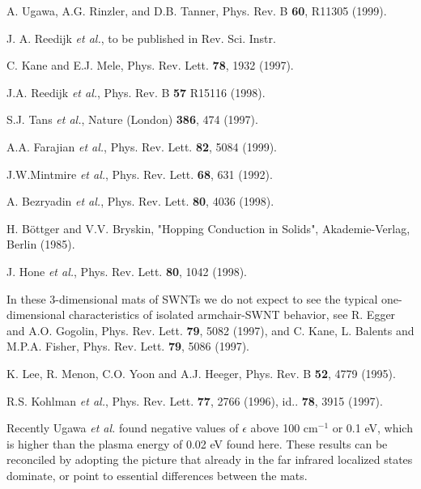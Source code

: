 \begin{multicols}{2}
\begin{thebibliography}{10}
A. Ugawa, A.G. Rinzler, and D.B. Tanner, Phys. Rev. B {\bf 60}, R11305
(1999).

{J. A. Reedijk {\sl et al.}, to be published in Rev. Sci. Instr.}

{C. Kane and E.J. Mele, Phys. Rev. Lett. {\bf 78}, 1932 (1997). }

{J.A. Reedijk {\sl et al.}, Phys. Rev. B {\bf 57} R15116 (1998).}

{S.J. Tans {\sl et al.}, Nature (London) {\bf 386}, 474 (1997). }

{A.A. Farajian {\sl et al.}, Phys. Rev. Lett. {\bf 82}, 5084 (1999). }

{J.W.Mintmire {\sl et al.}, Phys. Rev. Lett. {\bf 68}, 631 (1992). }

{A. Bezryadin {\sl et al.}, Phys. Rev. Lett. {\bf 80}, 4036 (1998). }

{H. B\"ottger and V.V. Bryskin, "Hopping Conduction in Solids",
Akademie-Verlag, Berlin (1985).  }


{J. Hone {\sl et al.}, Phys. Rev. Lett. {\bf 80}, 1042 (1998). }

 In these 3-dimensional mats of SWNTs we do not expect to see the
typical one-dimensional characteristics of isolated armchair-SWNT behavior,
see R. Egger and A.O. Gogolin, Phys. Rev. Lett. {\bf 79}, 5082 (1997), and
C. Kane, L. Balents and M.P.A. Fisher, Phys. Rev. Lett. {\bf 79}, 5086
(1997).

K. Lee, R. Menon, C.O. Yoon and A.J. Heeger, Phys. Rev. B {\bf 52}, 4779
(1995).


{R.S. Kohlman {\sl et al.}, Phys. Rev. Lett. {\bf 77}, 2766 (1996), id..
{\bf 78}, 3915 (1997).  }


 Recently Ugawa {\it et al.}\cite{Ugawa99} found negative
values of $\epsilon$ above 100 cm$^{-1}$ or 0.1 eV, which is higher than the
plasma energy of 0.02 eV found here.  These results
can be reconciled by adopting the picture that already in the far infrared
localized states dominate, or point to essential differences between the
mats.


\end{thebibliography}

\end{multicols}


